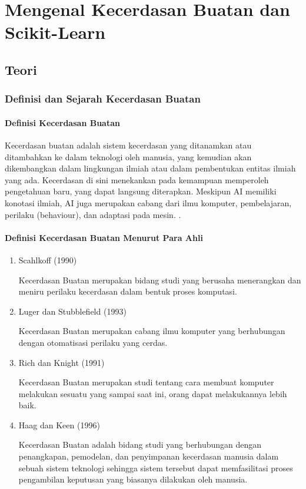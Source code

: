 \chapter{Mengenal Kecerdasan Buatan dan Scikit-Learn}
\section{Teori}

\subsection{Definisi dan Sejarah Kecerdasan Buatan}

\subsubsection{Definisi Kecerdasan Buatan}
Kecerdasan buatan adalah sistem kecerdasan yang ditanamkan atau ditambahkan ke dalam teknologi oleh manusia, yang kemudian akan dikembangkan dalam lingkungan ilmiah atau dalam pembentukan entitas ilmiah yang ada. Kecerdasan di sini menekankan pada kemampuan memperoleh pengetahuan baru, yang dapat langsung diterapkan. Meskipun AI memiliki konotasi ilmiah, AI juga merupakan cabang dari ilmu komputer, pembelajaran, perilaku (behaviour), dan adaptasi pada mesin. \cite{purwanti2017analisis}. 

\subsubsection{Definisi Kecerdasan Buatan Menurut Para Ahli}
\begin{enumerate}
    \item Scahlkoff (1990)
    
    \par Kecerdasan Buatan merupakan bidang studi yang berusaha menerangkan dan meniru perilaku kecerdasan dalam bentuk proses komputasi.\cite{ai2011kecerdasan}
    
    \item Luger dan Stubblefield (1993)
    
    \par Kecerdasan Buatan merupakan cabang ilmu komputer yang berhubungan dengan otomatisasi perilaku yang cerdas.\cite{ai2011kecerdasan}
    
    \item Rich dan Knight (1991)
    
    \par Kecerdasan Buatan merupakan studi tentang cara membuat komputer melakukan sesuatu yang sampai saat ini, orang dapat melakukannya lebih baik.\cite{ai2011kecerdasan}
    
    \item Haag dan Keen (1996)
    
    \par Kecerdasan Buatan adalah bidang studi yang berhubungan dengan penangkapan, pemodelan, dan penyimpanan kecerdasan manusia dalam sebuah sistem teknologi sehingga sistem tersebut dapat memfasilitasi proses pengambilan keputusan yang biasanya dilakukan oleh manusia.\cite{ai2011kecerdasan}
\end{enumerate}

